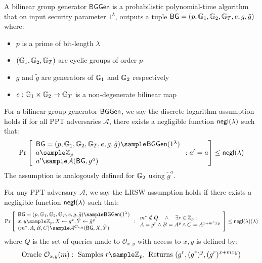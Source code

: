 \begin{definition}
A bilinear group generator $\mathsf{BGGen}$ is a probabilistic polynomial-time algorithm that on input security parameter $1^\lambda$, outputs a tuple $\mathsf{BG} = (p, \mathbb{G}_1, \mathbb{G}_2, \mathbb{G}_T, e, g, \tilde{g})$ where:
\begin{itemize}
    \item $p$ is a prime of bit-length $\lambda$
    \item $(\mathbb{G}_1, \mathbb{G}_2, \mathbb{G}_T)$ are cyclic groups of order $p$
    \item $g$ and $\tilde{g}$ are generators of $\mathbb{G}_1$ and $\mathbb{G}_2$ respectively
    \item $e: \mathbb{G}_1 \times \mathbb{G}_2 \rightarrow \mathbb{G}_T$ is a non-degenerate bilinear map
\end{itemize}
\end{definition}

\begin{definition}
For a bilinear group generator $\mathsf{BGGen}$, we say the discrete logarithm assumption holds if for all PPT adversaries $\mathcal{A}$, there exists a negligible function ${\mathsf{negl}(\lambda)}$ such that:
$$\Pr\left[\begin{array}{l}
    \BG = (p, \G_1, \G_2, \G_T, e, g, \tilde{g}) \sample \BGGen(1^\lambda) \\
    a \sample \Z_p \\
    a' \sample \mathcal{A}(\BG, g^a)
\end{array} : a' = a\right] \leq \negl$$
The assumption is analogously defined for $\mathbb{G}_2$ using $\tilde{g}^a$.
\end{definition}



\begin{definition}
For any PPT adversary $\mathcal{A}$, we say the LRSW assumption holds if there exists a negligible function ${\mathsf{negl}(\lambda)}$ such that:
$$\Pr\left[\begin{array}{l}
    \BG = (p, \G_1, \G_2, \G_T, e, g, \tilde{g}) \sample \BGGen(1^\lambda) \\
    x,y \sample \Z_p, X \gets g^x, \tilde{Y} \gets \tilde{g}^y \\
    (m^*, A, B, C) \sample \mathcal{A}^{\mathcal{O}_{x,y}}(\BG, X, \tilde{Y})
\end{array} : \begin{array}{l}
    m^* \notin Q \quad \land \quad \exists r \in \Z_p :\\
    A = g^r \land B = A^y \land C = A^{x+m^*xy}
\end{array}\right] \leq \negl(\lambda)$$
where $Q$ is the set of queries made to $\mathcal{O}_{x,y}$ with access to $x,y$ is defined by:
\[
\text{Oracle }\mathcal{O}_{x,y}(m): \text{ Samples } r \sample \Z_p, \text{ Returns } (g^r, (g^r)^y, (g^r)^{x+mxy})
\]
\end{definition}


